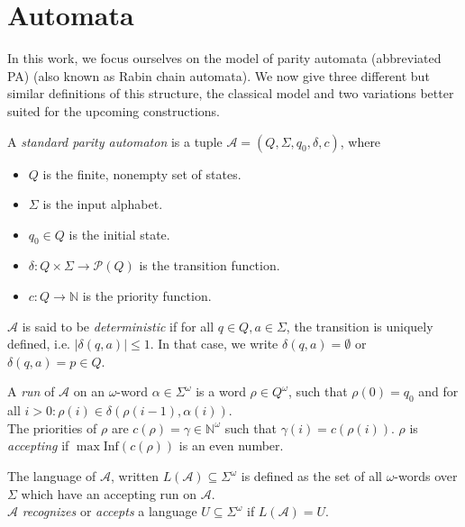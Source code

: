 \section{Automata}
In this work, we focus ourselves on the model of parity automata (abbreviated PA) (also known as Rabin chain automata). We now give three different but similar definitions of this structure, the classical model and two variations better suited for the upcoming constructions. 


\begin{defn}
	A \emph{standard parity automaton} is a tuple $\mathcal{A} = (Q, \Sigma, q_0, \delta, c)$, where
	\begin{itemize}
		\item $Q$ is the finite, nonempty set of states.
		\item $\Sigma$ is the input alphabet.
		\item $q_0 \in Q$ is the initial state.
		\item $\delta : Q \times \Sigma \rightarrow \mathcal{P}(Q)$ is the transition function.
		\item $c : Q \rightarrow \mathbb{N}$ is the priority function.
	\end{itemize}
	$\mathcal{A}$ is said to be \emph{deterministic} if for all $q \in Q, a \in \Sigma$, the transition is uniquely defined, i.e. $|\delta(q, a)| \leq 1$. In that case, we write $\delta(q, a) = \emptyset$ or $\delta(q, a) = p \in Q$.
	
	A \emph{run} of $\mathcal{A}$ on an $\omega$-word $\alpha \in \Sigma^\omega$ is a word $\rho \in Q^\omega$, such that $\rho(0) = q_0$ and for all $i > 0: \rho(i) \in \delta(\rho(i-1), \alpha(i))$. \\
	The priorities of $\rho$ are $c(\rho) = \gamma \in \mathbb{N}^\omega$ such that $\gamma(i) = c(\rho(i))$. $\rho$ is \emph{accepting} if $\max \text{Inf}(c(\rho))$ is an even number.
	
	The language of $\mathcal{A}$, written $L(\mathcal{A}) \subseteq \Sigma^\omega$ is defined as the set of all $\omega$-words over $\Sigma$ which have an accepting run on $\mathcal{A}$. \\
	$\mathcal{A}$ \emph{recognizes} or \emph{accepts} a language $U \subseteq \Sigma^\omega$ if $L(\mathcal{A}) = U$.
\end{defn}


